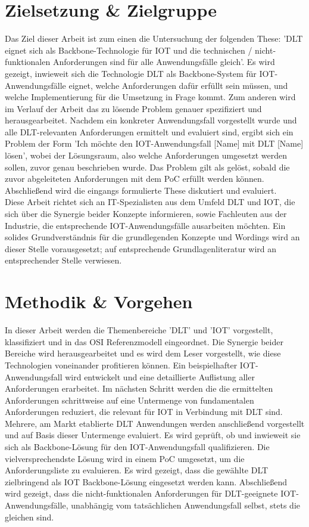 %
%
\section{Zielsetzung \& Zielgruppe}
\label{sec:intro:goal}
Das Ziel dieser Arbeit ist zum einen die Untersuchung der folgenden These: '\ac{DLT} eignet sich als Backbone-Technologie für \ac{IOT} und die technischen / nicht-funktionalen Anforderungen sind für alle Anwendungsfälle gleich'. Es wird gezeigt, inwieweit sich die Technologie \ac{DLT} als Backbone-System für \ac{IOT}-Anwendungsfälle eignet, welche Anforderungen dafür erfüllt sein müssen, und welche Implementierung für die Umsetzung in Frage kommt. Zum anderen wird im Verlauf der Arbeit das zu lösende Problem genauer spezifiziert und herausgearbeitet. Nachdem ein konkreter Anwendungsfall vorgestellt wurde und alle \ac{DLT}-relevanten Anforderungen ermittelt und evaluiert sind, ergibt sich ein Problem der Form 'Ich möchte den \ac{IOT}-Anwendungsfall [Name] mit \ac{DLT} [Name] lösen', wobei der Lösungsraum, also welche Anforderungen umgesetzt werden sollen, zuvor genau beschrieben wurde. Das Problem gilt als gelöst, sobald die zuvor abgeleiteten Anforderungen mit dem \ac{PoC} erfüllt werden können. Abschließend wird die eingangs formulierte These diskutiert und evaluiert.\\
Diese Arbeit richtet sich an IT-Spezialisten aus dem Umfeld \ac{DLT} und \ac{IOT}, die sich über die Synergie beider Konzepte informieren, sowie Fachleuten aus der Industrie, die entsprechende \ac{IOT}-Anwendungsfälle ausarbeiten möchten. Ein solides Grundverständnis für die grundlegenden Konzepte und Wordings wird an dieser Stelle vorausgesetzt; auf entsprechende Grundlagenliteratur wird an entsprechender Stelle verwiesen.

%
%
\section{Methodik \& Vorgehen}
\label{sec:intro:methodology}
In dieser Arbeit werden die Themenbereiche '\ac{DLT}' und '\ac{IOT}' vorgestellt, klassifiziert und in das \ac{OSI} Referenzmodell eingeordnet. Die Synergie beider Bereiche wird herausgearbeitet und es wird dem Leser vorgestellt, wie diese Technologien voneinander profitieren können. Ein beispielhafter \ac{IOT}-Anwendungsfall wird entwickelt und eine detaillierte Auflistung aller Anforderungen erarbeitet. Im nächsten Schritt werden die die ermittelten Anforderungen schrittweise auf eine Untermenge von fundamentalen Anforderungen reduziert, die relevant für \ac{IOT} in Verbindung mit \ac{DLT} sind. Mehrere, am Markt etablierte \ac{DLT} Anwendungen werden anschließend vorgestellt und auf Basis dieser Untermenge evaluiert. Es wird geprüft, ob und inwieweit sie sich als Backbone-Lösung für den \ac{IOT}-Anwendungsfall qualifizieren. Die vielversprechendste Lösung wird in einem \ac{PoC} umgesetzt, um die Anforderungsliste zu evaluieren. Es wird gezeigt, dass die gewählte \ac{DLT} zielbringend als \ac{IOT} Backbone-Lösung eingesetzt werden kann. Abschließend wird gezeigt, dass die nicht-funktionalen Anforderungen für \ac{DLT}-geeignete \ac{IOT}-Anwendungsfälle, unabhängig vom tatsächlichen Anwendungsfall selbst, stets die gleichen sind.

